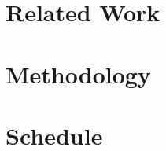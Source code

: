 \documentclass[a4paper, 12pt]{article}
\begin{document}
\section{Related Work}



\section{Methodology}



\section{Schedule}

\end{document}
